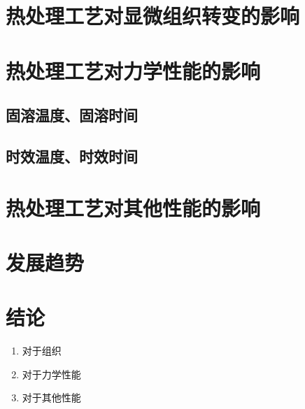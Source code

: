 \documentclass[
class = book,
zihao = -4,
font = noto,
paper = a4paper,
openany
]{easybook}
\begin{document}
	\chapter{热处理工艺对显微组织转变的影响}
	\chapter{热处理工艺对力学性能的影响}

	\section{固溶温度、固溶时间}
	\section{时效温度、时效时间}
	\chapter{热处理工艺对其他性能的影响}

	\chapter{发展趋势}
	\chapter{结论}
	\begin{enumerate}
		\item 对于组织
		\item 对于力学性能
		\item 对于其他性能
	\end{enumerate}


	\backmatter
	\listoffigures
	\listoftables
	\clearpage
	
\end{document}
